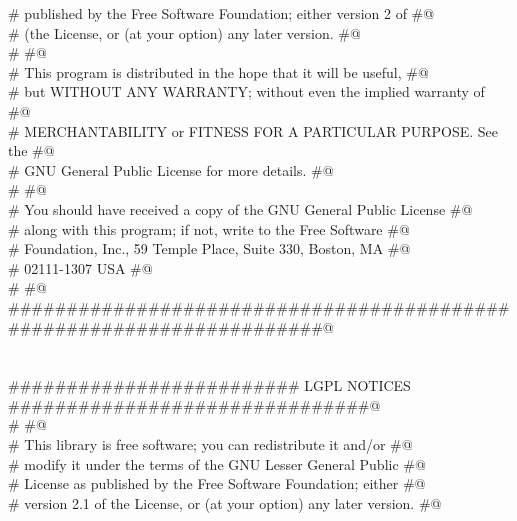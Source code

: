 \documentclass[10pt,a4paper,twoside,notitlepage]{article}
\begin{document}
\begin{flushleft}
\begin{minipage}{\linewidth}
\begin{list}{}{}
\mbox{}\verb@# published by the Free Software Foundation; either version 2 of     #@\\
\mbox{}\verb@# (the License, or (at your option) any later version.               #@\\
\mbox{}\verb@#                                                                    #@\\
\mbox{}\verb@# This program is distributed in the hope that it will be useful,    #@\\
\mbox{}\verb@# but WITHOUT ANY WARRANTY; without even the implied warranty of     #@\\
\mbox{}\verb@# MERCHANTABILITY or FITNESS FOR A PARTICULAR PURPOSE.  See the      #@\\
\mbox{}\verb@# GNU General Public License for more details.                       #@\\
\mbox{}\verb@#                                                                    #@\\
\mbox{}\verb@# You should have received a copy of the GNU General Public License  #@\\
\mbox{}\verb@# along with this program; if not, write to the Free Software        #@\\
\mbox{}\verb@# Foundation, Inc., 59 Temple Place, Suite 330, Boston, MA           #@\\
\mbox{}\verb@# 02111-1307  USA                                                    #@\\
\mbox{}\verb@#                                                                    #@\\
\mbox{}\verb@######################################################################@\\
\mbox{}\verb@@\\
\mbox{}\verb@@\\
\mbox{}\verb@######################### LGPL NOTICES ###############################@\\
\mbox{}\verb@#                                                                    #@\\
\mbox{}\verb@# This library is free software; you can redistribute it and/or      #@\\
\mbox{}\verb@# modify it under the terms of the GNU Lesser General Public         #@\\
\mbox{}\verb@# License as published by the Free Software Foundation; either       #@\\
\mbox{}\verb@# version 2.1 of the License, or (at your option) any later version. #@\\

\end{list}
\end{minipage}
\end{flushleft}
\end{document}
